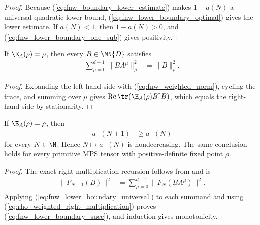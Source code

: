 \begin{proof}
    \leanok
    Because (\ref{eq:fnw_boundary_lower_estimate}) makes $1-a(N)$ a universal
    quadratic lower bound, (\ref{eq:fnw_lower_boundary_optimal}) gives the
    lower estimate. If $a(N)<1$, then $1-a(N)>0$, and
    (\ref{eq:fnw_lower_boundary_one_sub}) gives positivity.
\end{proof}

\begin{lemma}
    \label{thm:rho_weighted_right_multiplication}
    \leanok
    If $\E_A(\rho)=\rho$, then every $B\in\MN{D}$ satisfies
    \begin{align}
        \sum_{\mu=0}^{d-1}\lVert BA^\mu\rVert_\rho^2
         & =\lVert B\rVert_\rho^2.
        \label{eq:rho_weighted_right_multiplication}
    \end{align}
\end{lemma}

\begin{proof}
    \leanok
    Expanding the left-hand side with (\ref{eq:fnw_weighted_norm}), cycling the
    trace, and summing over $\mu$ gives
    $\operatorname{Re}\tr(\E_A(\rho)B^\dagger B)$, which equals the
    right-hand side by stationarity.
\end{proof}

\begin{lemma}
    \label{thm:fnw_lower_boundary_mono}
    \leanok
    If $\E_A(\rho)=\rho$, then
    \begin{align}
        a_-(N+1) & \geq a_-(N)
        \label{eq:fnw_lower_boundary_succ}
    \end{align}
    for every $N\in\N$. Hence $N\mapsto a_-(N)$ is nondecreasing. The same
    conclusion holds for every primitive MPS tensor with positive-definite
    fixed point $\rho$.
\end{lemma}

\begin{proof}
    \leanok
    The exact right-multiplication recursion follows from
    \cite[Equation~(5.5)]{Fannes1992Finitely} and is
    \begin{align}
        \lVert F_{N+1}(B)\rVert^2
         & =\sum_{\mu=0}^{d-1}\lVert F_N(BA^\mu)\rVert^2.
    \end{align}
    Applying (\ref{eq:fnw_lower_boundary_universal}) to each summand and using
    (\ref{eq:rho_weighted_right_multiplication}) proves
    (\ref{eq:fnw_lower_boundary_succ}), and induction gives monotonicity.
\end{proof}

